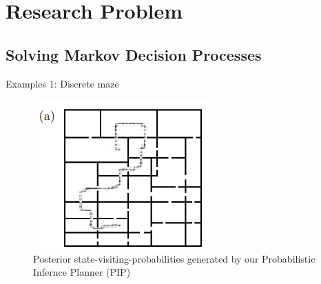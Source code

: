 \documentclass[]{beamer}
\theoremstyle{definition}
\begin{document}
\section{Research Problem}

\subsection{Solving Markov Decision Processes}

\begin{frame}{Examples 1: Discrete maze}
    \begin{figure}
        \centering
        \includegraphics[width=0.6\textwidth]{figs/fig_3a_maze_example.png}
        \caption{Posterior state-visiting-probabilities generated by our Probabilistic Infernce Planner (PIP)}
        \label{fig:my_label}
    \end{figure}
\end{frame}
\end{document}
